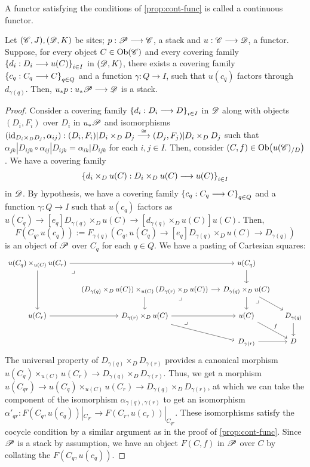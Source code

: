 \documentclass[11pt]{amsart}
\begin{document}
\begin{defn}
A functor satisfying the conditions of \cref{prop:cont-func} is called a continuous functor.
\end{defn}

\begin{prop}\label{prop:cocont-func}
Let $(\mathscr{C}, J), (\mathscr{D}, K)$ be sites; $p : \sP \to \sC$, a stack and $u : \sC \to \sD$, a functor.
Suppose, for every object $C \in \Ob{\sC}$ and every covering family
$\set{d_i : D_i \to u(C)}_{i \in I}$ in $(\mathscr{D}, K)$,
there exists a covering family $\set{c_q : C_q \to C}_{q \in Q}$ and a function
$\gamma : Q \to I$, such that $u(c_q)$ factors through $d_{\gamma(q)}$.
Then, $u_*p : u_*\sP \to \sD$ is a stack.
\end{prop}
\begin{proof}
Consider a covering family $\set{d_i : D_i \to D}_{i \in I}$ in $\mathscr{D}$ along with
objects $(D_i, F_i)$ over $D_i$ in $u_*\mathscr{P}$ and isomorphisms
$(\id_{D_i \times_D D_j}, \alpha_{ij}) :
(D_i, F_i)|D_i \times_D D_j \to[\cong] (D_j, F_j)|D_i \times_D D_j$
such that $\alpha_{jk}|D_{ijk} \circ \alpha_{ij}|D_{ijk} = \alpha_{ik}|D_{ijk}$ for each
$i, j \in I$. Then, consider $(C, f) \in \Ob{u(\sC)_{/D}}$. We have a covering family
\[
\set{d_i \times_D u(C) : D_i \times_D u(C) \to u(C)}_{i \in I}
\]
in $\mathscr{D}$.
By hypothesis, we have a covering family $\set{c_q : C_q \to C}_{q \in Q}$ and a function
$\gamma : Q \to I$ such that $u(c_q)$ factors as
$u(C_q) \to[e_q] D_{\gamma(q)} \times_D u(C) \to[d_{\gamma(q)} \times_D u(C)] u(C)$.
Then,
\[
F(C_q, u(c_q)) := F_{\gamma(q)}(C_q, u(C_q) \to[e_q] D_{\gamma(q)} \times_D u(C) \to D_{\gamma(q)})
\]
is an object of $\mathscr{P}$ over $C_q$ for each $q \in Q$. We have a pasting of Cartesian squares:
\[\begin{tikzcd}[column sep=small]
u(C_q) \times_{u(C)} u(C_r)
    \ar[rr]
    \ar[dd]
    \ar[rd, phantom, "\lrcorner" very near start] & &
u(C_q)
    \ar[d] \\ &
(D_{\gamma(q)} \times_{D} u(C)) \times_{u(C)} (D_{\gamma(r)} \times_{D} u(C))
    \ar[r]
    \ar[d]
    \ar[rd, phantom, "\lrcorner" very near start] &
D_{\gamma(q)} \times_{D} u(C)
    \ar[d]
    \ar[rd]
    \ar[rdd, phantom, "\lrcorner" very near start] \\
u(C_r)
    \ar[r] &
D_{\gamma(r)} \times_{D} u(C)
    \ar[r]
    \ar[rd, shift right]
    \ar[rrd, phantom, "\lrcorner" very near start] &
u(C)
    \ar[rd, "f"] &
D_{\gamma(q)}
    \ar[d] \\ & &
D_{\gamma(r)}
    \ar[r] &
D
\end{tikzcd}\]
The universal property of $D_{\gamma(q)} \times_D D_{\gamma(r)}$ provides a canonical morphism
$u(C_q) \times_{u(C)} u(C_r) \to D_{\gamma(q)} \times_D D_{\gamma(r)}$.
Thus, we get a morphism
$u(C_{qr}) \to u(C_q) \times_{u(C)} u(C_r) \to D_{\gamma(q)} \times_D D_{\gamma(r)}$, at which
we can take the component of the isomorphism $\alpha_{\gamma(q), \gamma(r)}$ to get an isomorphism
$\alpha'_{qr} : F(C_q, u(c_q))|_{C_{qr}} \to F(C_r, u(c_r))|_{C_{qr}}$. These isomorphisms satisfy
the cocycle condition by a similar argument as in the proof of \cref{prop:cont-func}. Since
$\mathscr{P}$ is a stack by assumption, we have an object $F(C, f)$ in $\mathscr{P}$ over $C$ by collating
the $F(C_q, u(c_q))$.


\end{proof}
\end{document}
